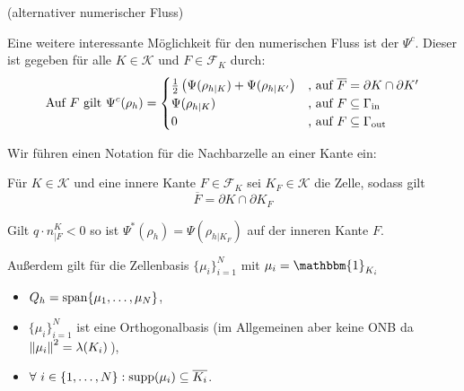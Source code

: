 \begin{remark}(alternativer numerischer Fluss)
	
	Eine weitere interessante Möglichkeit für den numerischen Fluss ist der  $ \Psi^c $. Dieser ist gegeben für alle $ K \in \mathcal{K} $ und $ F \in \mathcal{F}_K $ durch:
	\begin{gather*}
		\text{Auf } F \text{ gilt }\Psi^c(\rho_h) = \begin{cases}
		\frac{1}{2} \left( \Psi(\rho_{h|K}) + \Psi(\rho_{h|K'}  \right) &\text{, auf } \overline{F} = \partial K \cap \partial K'\\
		\Psi(\rho_{h|K}) &\text{, auf } F \subseteq \Gamma_{{\text{in}}}\\
		0 &\text{, auf } F \subseteq \Gamma_{{\text{out}}} 
		\end{cases}
	\end{gather*}
\end{remark}

\begin{remark}
	Wir führen einen Notation für die Nachbarzelle an einer Kante ein:
	
	Für $ K \in \mathcal{K} $ und eine innere Kante $ F \in \mathcal{F}_K $ sei $ K_F \in \mathcal{K}$ die Zelle, sodass gilt \[ \overline{F} = \partial K \cap \partial K_F \]
	
	Gilt  $q\cdot n^K_{|F} < 0$ so ist $ \Psi^*(\rho_h) = \Psi(\rho_{h|K_F}) $ auf der inneren Kante $ F $.
\end{remark}
\bigskip
Außerdem gilt für die Zellenbasis $ \{\mu_i\}_{i=1}^N $ mit $ \mu_i = \mathbbm{1}_{K_i} $ 
\begin{itemize}
	\item $ Q_h = \operatorname{span}\{\mu_1, \dots , \mu_N\} $,
	\item $ \{\mu_i\}_{i=1}^N $ ist eine Orthogonalbasis (im Allgemeinen aber keine ONB da $ \norm{\mu_i}^2 = \lambda(K_i) $\,),
	\item $ \forall \ i \in \{1, \dots , N\}:  \operatorname{supp}(\mu_i) \subseteq \overline{K_i}$.
\end{itemize}
 
